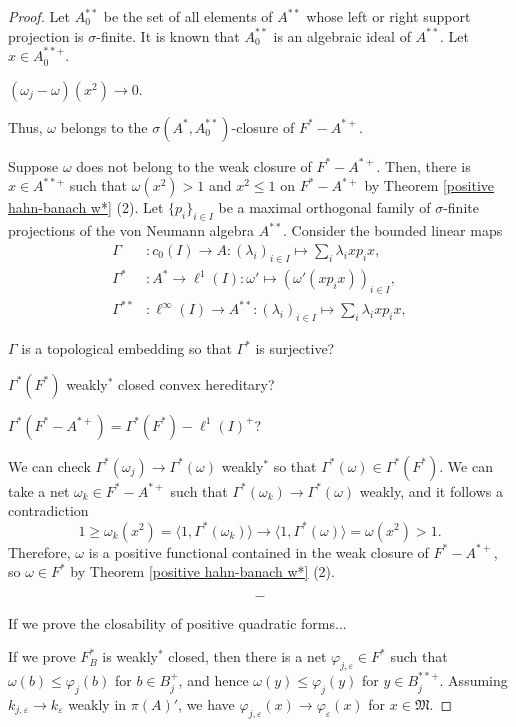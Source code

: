 \documentclass[a4paper]{amsart}
\newcommand{\e}{\varepsilon}
\theoremstyle{plain}
\theoremstyle{definition}
\begin{document}
\begin{proof}
Let $A_0^{**}$ be the set of all elements of $A^{**}$ whose left or right support projection is $\sigma$-finite.
It is known that $A_0^{**}$ is an algebraic ideal of $A^{**}$.
Let $x\in A_0^{**+}$.

$(\omega_j-\omega)(x^2)\to0$.

Thus, $\omega$ belongs to the $\sigma(A^*,A_0^{**})$-closure of $F^*-A^{*+}$.


Suppose $\omega$ does not belong to the weak closure of $F^*-A^{*+}$.
Then, there is $x\in A^{**+}$ such that $\omega(x^2)>1$ and $x^2\le1$ on $F^*-A^{*+}$ by Theorem \ref{positive hahn-banach w*} (2).
Let $\{p_i\}_{i\in I}$ be a maximal orthogonal family of $\sigma$-finite projections of the von Neumann algebra $A^{**}$.
Consider the bounded linear maps
\begin{align*}
\Gamma&:c_0(I)\to A:(\lambda_i)_{i\in I}\mapsto\sum_i\lambda_ixp_ix,\\
\Gamma^*&:A^*\to\ell^1(I):\omega'\mapsto(\omega'(xp_ix))_{i\in I},\\
\Gamma^{**}&:\ell^\infty(I)\to A^{**}:(\lambda_i)_{i\in I}\mapsto\sum_i\lambda_ixp_ix,
\end{align*}

$\Gamma$ is a topological embedding so that $\Gamma^*$ is surjective?

$\Gamma^*(F^*)$ weakly$^*$ closed convex hereditary?

$\Gamma^*(F^*-A^{*+})=\Gamma^*(F^*)-\ell^1(I)^+$?

We can check $\Gamma^*(\omega_j)\to\Gamma^*(\omega)$ weakly$^*$ so that $\Gamma^*(\omega)\in\Gamma^*(F^*)$.
We can take a net $\omega_k\in F^*-A^{*+}$ such that $\Gamma^*(\omega_k)\to\Gamma^*(\omega)$ weakly, and it follows a contradiction
\[1\ge\omega_k(x^2)=\langle1,\Gamma^*(\omega_k)\rangle\to\langle1,\Gamma^*(\omega)\rangle=\omega(x^2)>1.\]
Therefore, $\omega$ is a positive functional contained in the weak closure of $F^*-A^{*+}$, so $\omega\in F^*$ by Theorem \ref{positive hahn-banach w*} (2).




\[-\]


If we prove the closability of positive quadratic forms...

If we prove $F_B^*$ is weakly$^*$ closed, then there is a net $\varphi_{j,\e}\in F^*$ such that $\omega(b)\le\varphi_j(b)$ for $b\in B_j^+$, and hence $\omega(y)\le\varphi_j(y)$ for $y\in B_j^{**+}$.
Assuming $k_{j,\e}\to k_\e$ weakly in $\pi(A)'$, we have $\varphi_{j,\e}(x)\to\varphi_\e(x)$ for $x\in\mathfrak{M}$.


\end{proof}
\end{document}
